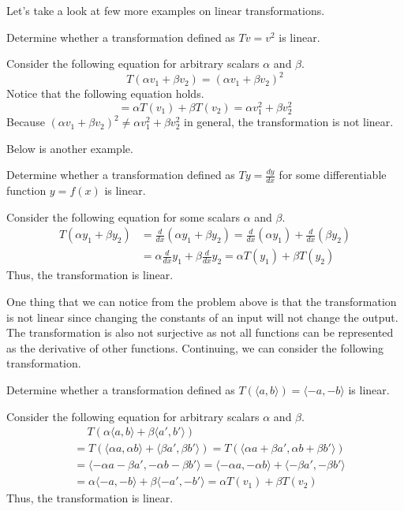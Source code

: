 \documentclass[../main.tex]{subfiles}
\begin{document}
Let's take a look at few more examples on linear transformations.

\begin{problem}
Determine whether a transformation defined as $Tv = v^2$ is linear.
\end{problem}
\begin{solution}
Consider the following equation for arbitrary scalars $\alpha$ and
$\beta$.
\[
T(\alpha v_1 + \beta v_2)
= (\alpha v_1 + \beta v_2)^2
\]
Notice that the following equation holds.
\[
= \alpha T(v_1) + \beta T(v_2)
= \alpha v_1^2 + \beta v_2^2
\]
Because $(\alpha v_1 + \beta v_2)^2 \neq \alpha v_1^2 + \beta v_2^2$
in general, the transformation is not linear.
\end{solution}

Below is another example.

\begin{problem}
Determine whether a transformation defined as $Ty = \frac{dy}{dx}$
for some differentiable function $y = f(x)$ is linear.
\end{problem}
\begin{solution}
Consider the following equation for some scalars $\alpha$ and $\beta$.
\begin{align*}
    T(\alpha y_1 + \beta y_2)
    &= \frac{d}{dx} (\alpha y_1 + \beta y_2)
    = \frac{d}{dx} (\alpha y_1) + \frac{d}{dx} (\beta y_2) \\
    &= \alpha \frac{d}{dx} y_1 + \beta \frac{d}{dx} y_2
    = \alpha T(y_1) + \beta T(y_2)
\end{align*}
Thus, the transformation is linear.
\end{solution}

One thing that we can notice from the problem above is that the
transformation is not linear since changing the constants of an
input will not change the output. The transformation is also not
surjective as not all functions can be represented as the derivative
of other functions. Continuing, we can consider the following
transformation.

\begin{problem}
Determine whether a transformation defined as $T(\langle a, b \rangle)
= \langle -a, -b \rangle$ is linear.
\end{problem}
\begin{solution}
Consider the following equation for arbitrary scalars $\alpha$ and
$\beta$.
\begin{align*}
    &\quad\ T(\alpha \langle a, b \rangle +
        \beta \langle a', b' \rangle) \\
    &= T(\langle \alpha a, \alpha b \rangle +
        \langle \beta a', \beta b' \rangle)
    = T(\langle \alpha a + \beta a', \alpha b + \beta b' \rangle) \\
    &= \langle -\alpha a - \beta a', -\alpha b - \beta b' \rangle
    = \langle -\alpha a, -\alpha b \rangle +
        \langle -\beta a', - \beta b' \rangle \\
    &= \alpha \langle -a, -b \rangle + \beta \langle -a', -b' \rangle
    = \alpha T(v_1) + \beta T(v_2)
\end{align*}
Thus, the transformation is linear.
\end{solution}
\end{document}
